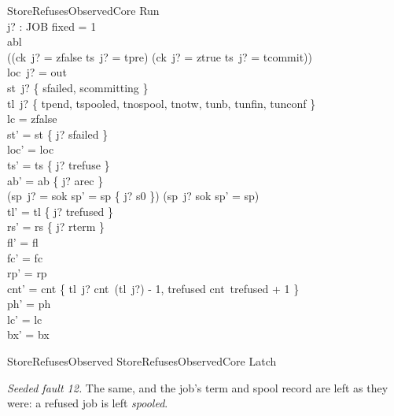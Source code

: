 \documentclass[a4paper,10pt,fleqn]{article}
\begin{document}
\begin{schema}{StoreRefusesObservedCore}
\Delta Run \\ j? : JOB
\where
fixed = 1 \\
abl  \\
((ck~j? = zfalse \land ts~j? = tpre) \lor (ck~j? = ztrue \land ts~j? = tcommit)) \\
loc~j? = out \\
st~j? \in \{ sfailed, scommitting \} \\
tl~j? \in \{ tpend, tspooled, tnospool, tnotw, tunb, tunfin, tunconf \} \\
lc = zfalse \\
st' = st \oplus \{ j? \mapsto sfailed \} \\
loc' = loc \\
ts' = ts \oplus \{ j? \mapsto trefuse \} \\
ab' = ab \oplus \{ j? \mapsto arec \} \\
(sp~j? = sok \implies sp' = sp \oplus \{ j? \mapsto s0 \}) \land (sp~j? \neq sok \implies sp' = sp) \\
tl' = tl \oplus \{ j? \mapsto trefused \} \\
rs' = rs \oplus \{ j? \mapsto rterm \} \\
fl' = fl \\
fc' = fc \\
rp' = rp \\
cnt' = cnt \oplus \{ tl~j? \mapsto cnt~(tl~j?) - 1, trefused \mapsto cnt~trefused + 1 \} \\
ph' = ph \\
lc' = lc \\
bx' = bx
\end{schema}

\begin{zed}
StoreRefusesObserved  StoreRefusesObservedCore \land Latch
\end{zed}

\emph{Seeded fault 12.} The same, and the job's term and spool record are left as
they were: a refused job is left \emph{spooled}.
\end{document}
